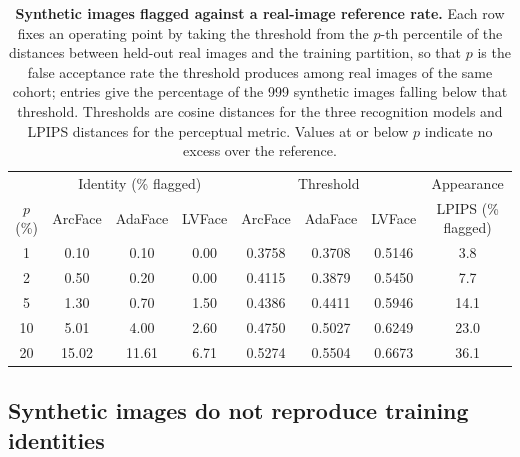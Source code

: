 \documentclass[11pt]{article}
\begin{document}
\FloatBarrier

\begin{table}[!htbp]
  \centering
  \caption{\textbf{Synthetic images flagged against a real-image reference
  rate.} Each row fixes an operating point by taking the threshold from the
  $p$-th percentile of the distances between held-out real images and the
  training partition, so that $p$ is the false acceptance rate the threshold
  produces among real images of the same cohort; entries give the percentage of
  the 999 synthetic images falling below that threshold. Thresholds are cosine
  distances for the three recognition models and LPIPS distances for the
  perceptual metric. Values at or below $p$ indicate no excess over the
  reference.}
  \label{tab:privacy-far}
  \begin{tabular}{cccccccc}
    \toprule
    & \multicolumn{3}{c}{Identity (\% flagged)} & \multicolumn{3}{c}{Threshold} & Appearance \\
    \cmidrule(lr){2-4} \cmidrule(lr){5-7} \cmidrule(lr){8-8}
    $p$ (\%) & ArcFace & AdaFace & LVFace & ArcFace & AdaFace & LVFace & LPIPS (\% flagged) \\
    \midrule
     1 &  0.10 &  0.10 & 0.00 & 0.3758 & 0.3708 & 0.5146 &  3.8 \\
     2 &  0.50 &  0.20 & 0.00 & 0.4115 & 0.3879 & 0.5450 &  7.7 \\
     5 &  1.30 &  0.70 & 1.50 & 0.4386 & 0.4411 & 0.5946 & 14.1 \\
    10 &  5.01 &  4.00 & 2.60 & 0.4750 & 0.5027 & 0.6249 & 23.0 \\
    20 & 15.02 & 11.61 & 6.71 & 0.5274 & 0.5504 & 0.6673 & 36.1 \\
    \bottomrule
  \end{tabular}
\end{table}

\subsection{Synthetic images do not reproduce training identities}

\end{document}
